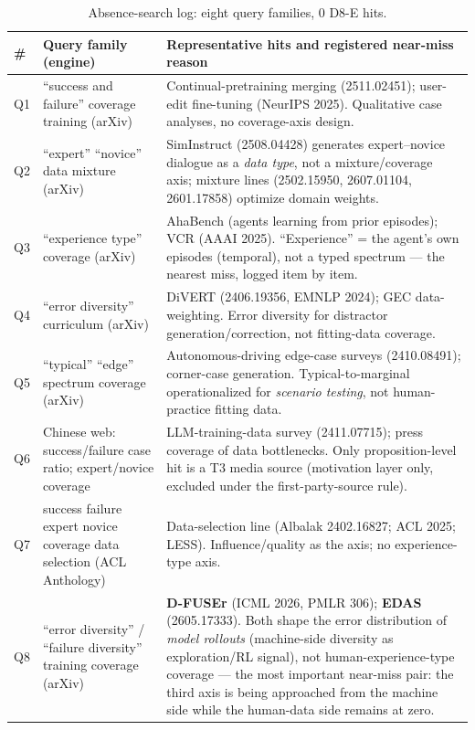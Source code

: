 \documentclass[10pt]{article}
\begin{document}
\begin{table}[h]
\centering
\caption{Absence-search log: eight query families, 0 D8-E hits.}
\label{tab:absence}
\small
\begin{tabular}{p{}p{}p{}}
\toprule
\# & Query family (engine) & Representative hits and registered near-miss reason \\
\midrule
Q1 & ``success and failure'' coverage training (arXiv) & Continual-pretraining merging (2511.02451); user-edit fine-tuning (NeurIPS 2025). Qualitative case analyses, no coverage-axis design. \\
Q2 & ``expert'' ``novice'' data mixture (arXiv) & SimInstruct (2508.04428) generates expert--novice dialogue as a \emph{data type}, not a mixture/coverage axis; mixture lines (2502.15950, 2607.01104, 2601.17858) optimize domain weights. \\
Q3 & ``experience type'' coverage (arXiv) & AhaBench (agents learning from prior episodes); VCR (AAAI 2025). ``Experience'' = the agent's own episodes (temporal), not a typed spectrum --- the nearest miss, logged item by item. \\
Q4 & ``error diversity'' curriculum (arXiv) & DiVERT (2406.19356, EMNLP 2024); GEC data-weighting. Error diversity for distractor generation/correction, not fitting-data coverage. \\
Q5 & ``typical'' ``edge'' spectrum coverage (arXiv) & Autonomous-driving edge-case surveys (2410.08491); corner-case generation. Typical-to-marginal operationalized for \emph{scenario testing}, not human-practice fitting data. \\
Q6 & Chinese web: success/failure case ratio; expert/novice coverage & LLM-training-data survey (2411.07715); press coverage of data bottlenecks. Only proposition-level hit is a T3 media source (motivation layer only, excluded under the first-party-source rule). \\
Q7 & success failure expert novice coverage data selection (ACL Anthology) & Data-selection line (Albalak 2402.16827; ACL 2025; LESS). Influence/quality as the axis; no experience-type axis. \\
Q8 & ``error diversity'' / ``failure diversity'' training coverage (arXiv) & \textbf{D-FUSEr} (ICML 2026, PMLR 306); \textbf{EDAS} (2605.17333). Both shape the error distribution of \emph{model rollouts} (machine-side diversity as exploration/RL signal), not human-experience-type coverage --- the most important near-miss pair: the third axis is being approached from the machine side while the human-data side remains at zero. \\
\bottomrule
\end{tabular}
\end{table}
\end{document}
